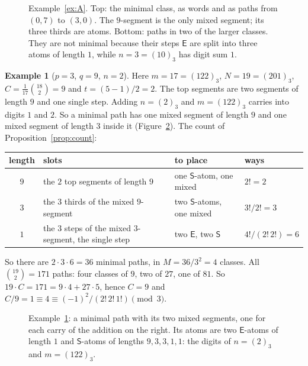 \documentclass[11pt]{article}
\theoremstyle{definition}
\newtheorem{example}[theorem]{Example}
\theoremstyle{remark}
\newcommand{\E}{\textsf{E}}
\newcommand{\Ss}{\textsf{S}}
\begin{document}
\begin{figure}[ht]
\centering
\begin{tikzpicture}

\end{tikzpicture}

\vspace{1.2em}
\begin{tikzpicture}

\end{tikzpicture}
\caption{Example~\ref{ex:A}. Top: the minimal class, as words and as paths from $(0,7)$ to $(3,0)$. The
$9$-segment is the only mixed segment; its three thirds are atoms. Bottom: paths in two of the larger classes. They are not
minimal because their steps $\E$ are split into three atoms of length $1$, while $n=3=(10)_3$ has digit sum $1$.}
\label{fig:exA}
\end{figure}

\begin{example}[$p=3$, $q=9$, $n=2$]\label{ex:B}
Here $m=17=(122)_3$, $N=19=(201)_3$, $C=\frac1{17}\binom{18}2=9$ and $t=(5-1)/2=2$. The top segments are two
segments of length $9$ and one single step. Adding $n=(2)_3$ and $m=(122)_3$ carries into digits $1$ and $2$.
So a minimal path has one mixed segment of length $9$ and one mixed segment of length $3$ inside it
(Figure~\ref{fig:exB}). The count of Proposition~\ref{prop:count}:

\begin{center}\small
\begin{tabular}{@{}clll@{}}
\toprule
length & slots & to place & ways\\
\midrule
$9$ & the $2$ top segments of length $9$ & one $\Ss$-atom, one mixed & $2!=2$\\
$3$ & the $3$ thirds of the mixed $9$-segment & two $\Ss$-atoms, one mixed & $3!/2!=3$\\
$1$ & the $3$ steps of the mixed $3$-segment, the single step & two $\E$, two $\Ss$ & $4!/(2!\,2!)=6$\\
\bottomrule
\end{tabular}
\end{center}

So there are $2\cdot3\cdot6=36$ minimal paths, in $M=36/3^2=4$ classes. All $\binom{19}2=171$ paths: four classes
of $9$, two of $27$, one of $81$. So $19\cdot C=171=9\cdot4+27\cdot5$, hence $C=9$ and
$C/9=1\equiv4\equiv(-1)^2/(2!\,2!\,1!)\pmod3$.
\end{example}

\begin{figure}[ht]
\centering
\begin{tikzpicture}

\end{tikzpicture}
\caption{Example~\ref{ex:B}: a minimal path with its two mixed segments, one for each carry of the addition on
the right. Its atoms are two $\E$-atoms of length $1$ and $\Ss$-atoms of lengths $9,3,3,1,1$: the digits of $n=(2)_3$ and
$m=(122)_3$.}
\label{fig:exB}
\end{figure}
\end{document}
